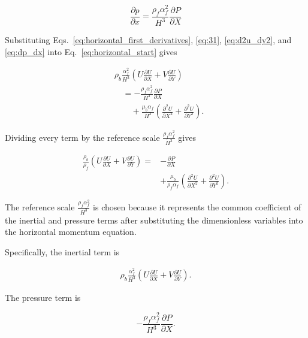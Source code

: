 \documentclass[preprint,3p,number]{elsarticle}
\begin{document}
\begin{equation}
\frac{\partial p}{\partial x}
=
\frac{\rho_f\alpha_f^2}{H^3}
\frac{\partial P}{\partial X}
\label{eq:dp_dx}
\end{equation}

Substituting Eqs.~\eqref{eq:horizontal_first_derivatives},
\eqref{eq:31}, \eqref{eq:d2u_dy2}, and \eqref{eq:dp_dx}
into Eq.~\eqref{eq:horizontal_start} gives

\begin{align}
&\rho_b\frac{\alpha_f^2}{H^3}
\left(
U\frac{\partial U}{\partial X}
+
V\frac{\partial U}{\partial Y}
\right)
\nonumber\\
&\quad =
-\frac{\rho_f\alpha_f^2}{H^3}
\frac{\partial P}{\partial X}
\nonumber\\
&\qquad+
\frac{\mu_b\alpha_f}{H^3}
\left(
\frac{\partial^2U}{\partial X^2}
+
\frac{\partial^2U}{\partial Y^2}
\right).
\label{eq:horizontal_substituted}
\end{align}

Dividing every term by the reference scale
\(\displaystyle \frac{\rho_f\alpha_f^2}{H^3}\) gives

\begin{align}
\frac{\rho_b}{\rho_f}
\left(
U\frac{\partial U}{\partial X}
+
V\frac{\partial U}{\partial Y}
\right)
={}&-\frac{\partial P}{\partial X}
\nonumber\\
&+\frac{\mu_b}{\rho_f\alpha_f}
\left(
\frac{\partial^2U}{\partial X^2}
+
\frac{\partial^2U}{\partial Y^2}
\right).
\label{eq:horizontal_scaled}
\end{align}

The reference scale
\(\displaystyle \frac{\rho_f\alpha_f^2}{H^3}\)
is chosen because it represents the common coefficient of
the inertial and pressure terms after substituting the
dimensionless variables into the horizontal momentum equation.

\par\vspace{\baselineskip}
Specifically, the inertial term is

\begin{equation}
\begin{aligned}
\rho_b\frac{\alpha_f^2}{H^3}
\left(
U\frac{\partial U}{\partial X}
+
V\frac{\partial U}{\partial Y}
\right).
\end{aligned}
\end{equation}

The pressure term is

\begin{equation}
-\frac{\rho_f\alpha_f^2}{H^3}
\frac{\partial P}{\partial X}.
\end{equation}
\end{document}
